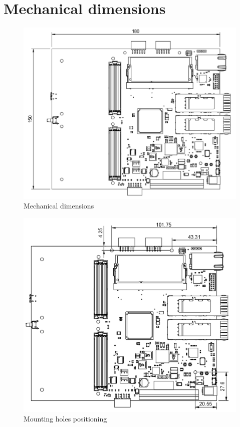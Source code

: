 \documentclass[12pt,oneside,a4]{article}
\begin{document}
\section{Mechanical dimensions}

\begin{figure}[H]
\begin{center}
\includegraphics[width=1\linewidth]{mechanical.png}
 \caption{Mechanical dimensions}\label{mechanical}
\end{center}
\end{figure}

\begin{figure}[H]
\begin{center}
\includegraphics[width=1\linewidth]{holes.png}
 \caption{Mounting holes positioning}\label{holes}
\end{center}
\end{figure}
\end{document}
